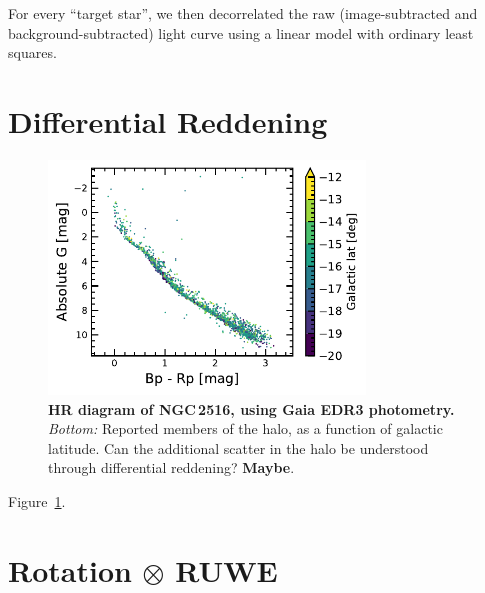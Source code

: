 \documentclass[12pt,twocolumn,tighten]{aastex63}
\begin{document}
For every ``target star'', we then decorrelated the raw
(image-subtracted and background-subtracted) light curve
using a linear model with ordinary least squares.

\section{Differential Reddening}
\label{app:diffred}

\begin{figure}[t]
	\begin{center}
		\leavevmode
			\includegraphics[width=0.75\textwidth]{f2b.pdf}
	\end{center}
	\vspace{-0.7cm}
  \caption{ {\bf HR diagram of NGC\,2516, using Gaia EDR3 photometry.}
    {\it Bottom:} Reported members of the halo, as a function of
    galactic latitude. Can the additional scatter in the halo be
    understood through differential reddening?
    {\bf Maybe}.
    \label{fig:diffred}
  }
\end{figure}

Figure~\ref{fig:diffred}.


\section{Rotation $\otimes$ RUWE}
\label{app:ruwe}
\end{document}
